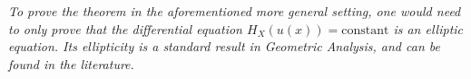 \begin{oss}
	\em To prove the theorem in the aforementioned more general setting, one would need to only prove that the differential equation $H_X(u(x))= \mathrm{constant}$ is an elliptic equation. Its ellipticity is a standard result in Geometric Analysis, and can be found in the literature. 
\end{oss}